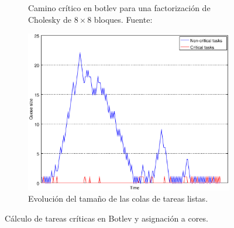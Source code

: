 \begin{figure}
  \centering
  
  \begin{subfigure}{.44\textwidth}
    \centering
    \setlength{\fboxsep}{5pt}
    \caption[Camino crítico en botlev para una factorización de Cholesky de
      $8\times8$ bloques]{Camino crítico en botlev para una factorización de Cholesky de
      $8\times8$ bloques. Fuente:~\cite{botlev}}
    \label{s3:fig:botlev_tdg}
  \end{subfigure}
  \begin{subfigure}{.55\textwidth}
    \centering
    \includegraphics[width=1\linewidth]{Figures/botlev-colas.eps}
    \caption{Evolución del tamaño de las colas de tareas
      listas.}
    \label{s3:fig:botlev_colas}
  \end{subfigure}  
  
  \caption{Cálculo de tareas críticas en Botlev y asignación a cores.}
  \label{s3:fig:botlev}
\end{figure}

